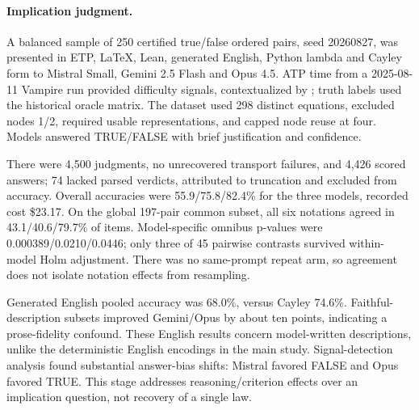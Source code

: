 \documentclass{article}
\newcommand{\pct}{\%}
\begin{document}
\paragraph{Implication judgment.}
A balanced sample of 250 certified true/false ordered pairs, seed 20260827,
was presented in ETP, LaTeX, Lean, generated English, Python lambda and Cayley
form to Mistral Small, Gemini 2.5 Flash and Opus 4.5. ATP time from a
2025-08-11 Vampire run provided difficulty signals, contextualized by
\citet{janota2025vampire}; truth labels used the historical oracle matrix.
The dataset used 298 distinct equations, excluded nodes 1/2, required usable
representations, and capped node reuse at four. Models answered TRUE/FALSE with
brief justification and confidence.

There were 4,500 judgments, no unrecovered transport failures, and 4,426 scored
answers; 74 lacked parsed verdicts, attributed to truncation and excluded from
accuracy. Overall accuracies were 55.9/75.8/82.4\pct{} for the three models,
recorded cost \$23.17. On the global 197-pair common subset, all six notations
agreed in 43.1/40.6/79.7\pct{} of items. Model-specific omnibus p-values were
0.000389/0.0210/0.0446; only three of 45 pairwise contrasts survived
within-model Holm adjustment. There was no same-prompt repeat arm, so agreement
does not isolate notation effects from resampling.

Generated English pooled accuracy was 68.0\pct{}, versus Cayley 74.6\pct{}.
Faithful-description subsets improved Gemini/Opus by about ten points,
indicating a prose-fidelity confound. These English results concern model-written
descriptions, unlike the deterministic English encodings in the main study.
Signal-detection analysis found substantial answer-bias shifts: Mistral favored
FALSE and Opus favored TRUE. This stage addresses reasoning/criterion effects
over an implication question, not recovery of a single law.

\clearpage

\end{document}
